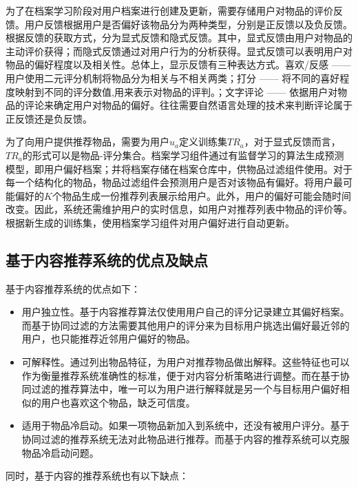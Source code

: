 为了在档案学习阶段对用户档案进行创建及更新，需要存储用户对物品的评价反馈\parencite{goldberg1992using}。用户反馈根据用户是否偏好该物品分为两种类型，分别是正反馈以及负反馈\parencite{holte1996inferring}。根据反馈的获取方式，分为显式反馈和隐式反馈。其中，显式反馈由用户对物品的主动评价获得；而隐式反馈通过对用户行为的分析获得。显式反馈可以表明用户对物品的偏好程度以及相关性。总体上，显示反馈有三种表达方式。喜欢/反感 —— 用户使用二元评分机制将物品分为相关与不相关两类\parencite{billsus1999hybrid}；打分 —— 将不同的喜好程度映射到不同的评分数值,用来表示对物品的评判\parencite{pazzani1996syskill}。；文字评论 —— 依据用户对物品的评论来确定用户对物品的偏好\parencite{resnick1994grouplens}。往往需要自然语言处理的技术来判断评论属于正反馈还是负反馈。

为了向用户提供推荐物品，需要为用户$u_a$定义训练集$TR_a$，对于显式反馈而言，$TR_a$的形式可以是物品-评分集合。档案学习组件通过有监督学习的算法生成预测模型，即用户偏好档案；并将档案存储在档案仓库中，供物品过滤组件使用。对于每一个结构化的物品，物品过滤组件会预测用户是否对该物品有偏好。将用户最可能偏好的$K$个物品生成一份推荐列表展示给用户。此外，用户的偏好可能会随时间改变。因此，系统还需维护用户的实时信息，如用户对推荐列表中物品的评价等。根据新生成的训练集，使用档案学习组件对用户偏好进行自动更新。

\subsection{基于内容推荐系统的优点及缺点}

基于内容推荐系统的优点如下：

\begin{itemize}
 \item 用户独立性。基于内容推荐算法仅使用用户自己的评分记录建立其偏好档案。而基于协同过滤的方法需要其他用户的评分来为目标用户挑选出偏好最近邻的用户，也只能推荐近邻用户偏好的物品。
 \item 可解释性。通过列出物品特征，为用户对推荐物品做出解释。这些特征也可以作为衡量推荐系统准确性的标准，便于对内容分析策略进行调整。而在基于协同过滤的推荐算法中，唯一可以为用户进行解释就是另一个与目标用户偏好相似的用户也喜欢这个物品，缺乏可信度。
 \item 适用于物品冷启动。如果一项物品新加入到系统中，还没有被用户评分。基于协同过滤的推荐系统无法对此物品进行推荐。而基于内容的推荐系统可以克服物品冷启动问题。
\end{itemize}

同时，基于内容的推荐系统也有以下缺点：

